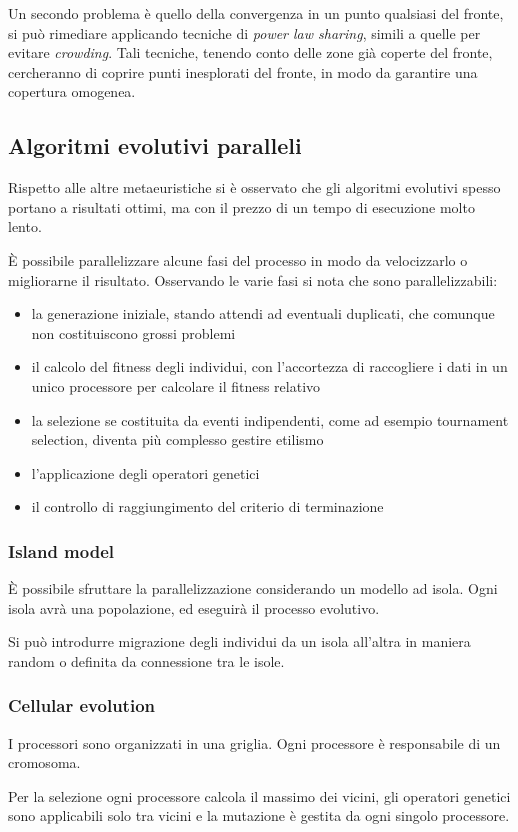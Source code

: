 \documentclass[a4paper]{article}
\begin{document}
Un secondo problema è quello della convergenza in un punto qualsiasi del fronte, 
si può rimediare applicando tecniche di \emph{power law sharing}, simili a quelle 
per evitare \emph{crowding}. Tali tecniche, tenendo conto delle zone già 
coperte del fronte, cercheranno di coprire punti inesplorati del fronte, 
in modo da garantire una copertura omogenea.

\subsection{Algoritmi evolutivi paralleli}
Rispetto alle altre metaeuristiche si è osservato che gli algoritmi evolutivi spesso
portano a risultati ottimi, ma con il prezzo di un tempo di esecuzione molto lento.

È possibile parallelizzare alcune fasi del processo in modo da 
velocizzarlo o migliorarne il risultato.
Osservando le varie fasi si nota che sono parallelizzabili:
\begin{itemize}
    \item la generazione iniziale, stando attendi ad eventuali duplicati, 
    che comunque non costituiscono grossi problemi
    \item il calcolo del fitness degli individui, con l'accortezza di raccogliere i dati in un unico processore per 
    calcolare il fitness relativo
    \item la selezione se costituita da eventi indipendenti, come ad esempio tournament selection, 
    diventa più complesso gestire etilismo
    \item l'applicazione degli operatori genetici
    \item il controllo di raggiungimento del criterio di terminazione
\end{itemize}

\subsubsection{Island model}
È possibile sfruttare la parallelizzazione considerando un modello ad isola.
Ogni isola avrà una popolazione, ed eseguirà il processo evolutivo.

Si può introdurre migrazione degli individui da un isola all'altra in maniera
random o definita da connessione tra le isole.

\subsubsection{Cellular evolution}
I processori sono organizzati in una griglia. Ogni processore è responsabile di un cromosoma.

Per la selezione ogni processore calcola il massimo dei vicini, gli operatori genetici sono applicabili 
solo tra vicini e la mutazione è gestita da ogni singolo processore.
\end{document}
